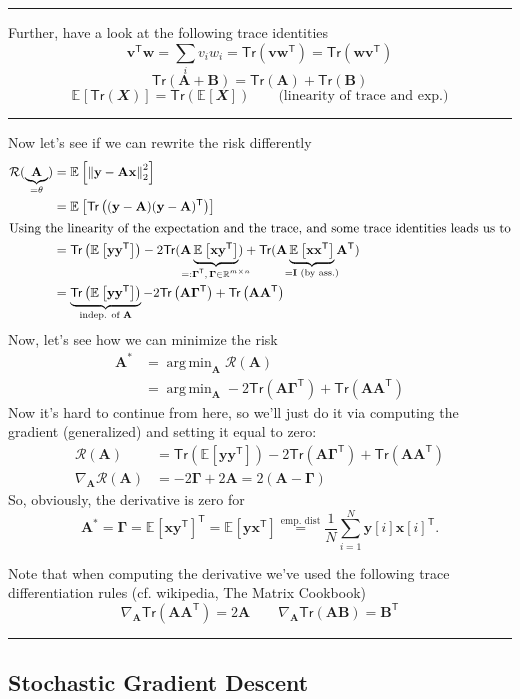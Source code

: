 \documentclass[a2paper,4pt]{extarticle}
\newcommand{\R}{\mathbb{R}}
\newcommand{\cR}{\mathcal{R}}
\newcommand{\norm}[1]{\left\lVert #1 \right\rVert}
\newcommand{\Tr}[1]{\mathsf{Tr}\left( #1 \right)}
\newcommand{\sTr}[1]{\mathsf{Tr}( #1 )}
\newcommand{\Exp}[2][]{{\mathbb{E}_{#1}}\left[ #2
\right]}
\newcommand{\rvX}{\mathbfit{X}}
\newcommand*{\T}{\mathsf{T}}
\DeclareMathOperator*{\argmin}{arg\,min}
\newcommand{\mat}[1]{\mathbf{#1}}
\renewcommand{\vec}[1]{\mathbf{#1}}
\newcommand{\vv}{\vec{v}}
\newcommand{\vw}{\vec{w}}
\newcommand{\vx}{\vec{x}}
\newcommand{\vy}{\vec{y}}
\newcommand{\MA}{\mat{A}}
\newcommand{\MB}{\mat{B}}
\newcommand{\MI}{\mat{I}}
\newcommand{\MGamma}{\mat{\Gamma}}
\newcommand{\sep}{\vspace{0pt}\noindent\hrule\vspace{0pt}}
\newcommand{\ssep}{\hdashrule[1.1ex]{\linewidth}{0.1pt}{0.3mm}\vspace{-6pt}}
\newcommand{\sep}{\vspace{5pt}\noindent\hrule\vspace{5pt}}
\newcommand{\ssep}{\hdashrule[1.1ex]{\linewidth}{0.1pt}{0.3mm}\vspace{-3pt}}
\begin{document}
\begin{landscape}
\begin{multicols*}{7}
\sep

Further, have a look at the following trace identities
\[
\vv^\T\vw=
\sum_{i}v_iw_i
=
\Tr{\vv\vw^\T}
=
\Tr{\vw\vv^\T}
\]
\[
\Tr{\MA+\MB}=\Tr{\MA} + \Tr{\MB}
\]
\[
\Exp{\Tr{\rvX}}=\Tr{\Exp{\rvX}} \qquad\text{(linearity of trace and exp.)}
\]

\sep

Now let's see if we can rewrite the risk differently
\begin{gather*}
\begin{align*}
\cR(\underbrace{\MA}_{=\theta})
&=
\Exp{\norm{\vy-\MA\vx}_2^2}
\\
&=
\Exp{\Tr{(\vy-\MA)(\vy-\MA)^\T}}
\\
\shortintertext{Using the linearity of the expectation and the trace, and some
trace identities leads us to}
&=
\Tr{\Exp{\vy\vy^\T}}
-2\sTr{\MA\underbrace{\Exp{\vx\vy^\T}}_{\mathclap{=:\MGamma^\T,\,\MGamma\in\R^{m\times
n}}}} +\sTr{\MA\underbrace{\Exp{\vx\vx^\T}}_{\mathclap{=\MI\text{ (by
ass.)}}}\MA^\T}
\\
&=
\underbrace{\Tr{\Exp{\vy\vy^\T}}}_{\mathclap{\text{indep. of }\MA}}
-2\Tr{\MA\MGamma^\T}
+\Tr{\MA\MA^\T}
\end{align*}
\end{gather*}
Now, let's see how we can minimize the risk
\begin{align*}
\MA^*
&=
\argmin_{\MA}
\cR(\MA)
\\
&=
\argmin_{\MA}
-2\Tr{\MA\MGamma^\T}
+\Tr{\MA\MA^\T}
\end{align*}
Now it's hard to continue from here, so we'll just do it via computing the
gradient (generalized) and setting it equal to zero:
\begin{align*}
\cR(\MA)
&=
\Tr{\Exp{\vy\vy^\T}}
-2\Tr{\MA\MGamma^\T}
+\Tr{\MA\MA^\T}
\\
\nabla_{\MA}\cR(\MA)
&=
-2\MGamma + 2\MA
=2(\MA-\MGamma)
\end{align*}
So, obviously, the derivative is zero for 
\[
\MA^*=\MGamma
=\Exp{\vx\vy^\T}^\T
=\Exp{\vy\vx^\T}
\stackrel{\text{emp. dist}}{=}
\frac{1}{N}\sum_{i=1}^N\vy[i]\vx[i]^\T.
\]

\ssep

Note that when computing the derivative we've used the following trace
differentiation rules (cf. wikipedia, The Matrix Cookbook)
\[
\nabla_{\MA}\Tr{\MA\MA^\T}=2\MA
\qquad
\nabla_{\MA}\Tr{\MA\MB}=\MB^\T
\]

\sep


\subsection{Stochastic Gradient Descent}


\end{multicols*}
\end{landscape}
\end{document}
